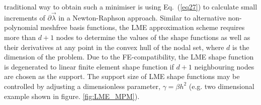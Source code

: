 traditional way to obtain such a minimiser  is using Eq.~(\ref{eq27})
to calculate small increments of $\partial\vec{\lambda}$ in a
Newton-Raphson approach. 
Similar to alternative non-polynomial meshfree basis functions, the
LME approximation scheme requires more than $d+1$ nodes to determine
the values of the shape functions as well as their derivatives at any
point in the convex hull of the nodal set, where $d$ is the dimension
of the problem. Due to the FE-compatibility, the LME shape function is
degenerated to linear finite element shape function if $d+1$
neighbouring nodes are chosen as the support. The support size of LME
shape functions may be controlled by adjusting a dimensionless
parameter, $\gamma=\beta h^2$ (e.g. two dimensional example shown in
figure. \ref{fig:LME_MPM})\cite{Arroyo2006}.


\begin{figure}
  \centering
  \qquad
\end{figure}
